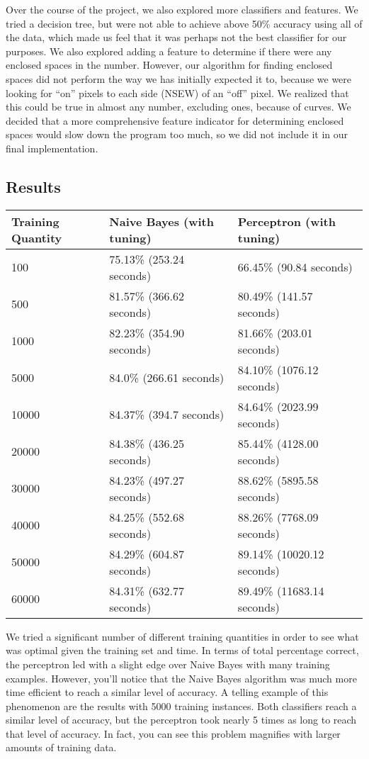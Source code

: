 \documentclass{article}
\theoremstyle{remark}
\begin{document}
    	Over the course of the project, we also explored more classifiers and features. We tried a decision tree, but were not able to achieve above 50\% accuracy using all of the data, which made us feel that it was perhaps not the best classifier for our purposes. We also explored adding a feature to determine if there were any enclosed spaces in the number. However, our algorithm for finding enclosed spaces did not perform the way we has initially expected it to, because we were looking for ``on'' pixels to each side (NSEW) of an ``off'' pixel. We realized that this could be true in almost any number, excluding ones, because of curves. We decided that a more comprehensive feature indicator for determining enclosed spaces would slow down the program too much, so we did not include it in our final implementation.
     \subsection*{Results}
     \begin{table}[h!]
        \centering
        \begin{tabular}{l|l|l}
        Training Quantity & Naive Bayes (with tuning) & Perceptron (with tuning)   \\ \hline
        100               & 75.13\% (253.24 seconds)  & 66.45\% (90.84 seconds)    \\
        500               & 81.57\% (366.62 seconds)  & 80.49\% (141.57 seconds)   \\
        1000              & 82.23\% (354.90 seconds)  & 81.66\% (203.01 seconds)   \\
        5000              & 84.0\% (266.61 seconds)   & 84.10\% (1076.12 seconds)  \\
        10000             & 84.37\% (394.7 seconds)   & 84.64\% (2023.99 seconds)  \\
        20000             & 84.38\% (436.25 seconds)  & 85.44\% (4128.00 seconds)  \\
        30000             & 84.23\% (497.27 seconds)  & 88.62\% (5895.58 seconds)  \\
        40000             & 84.25\% (552.68 seconds)  & 88.26\% (7768.09 seconds)  \\
        50000             & 84.29\% (604.87 seconds)  & 89.14\% (10020.12 seconds) \\
        60000             & 84.31\% (632.77 seconds)  & 89.49\% (11683.14 seconds) \\
        \end{tabular}
     \end{table}
     We tried a significant number of different training quantities in order to see what was optimal given the training set and time. In terms of total percentage correct, the perceptron led with a slight edge over Naive Bayes with many training examples. However, you'll notice that the Naive Bayes algorithm was much more time efficient to reach a similar level of accuracy. A telling example of this phenomenon are the results with 5000 training instances. Both classifiers reach a similar level of accuracy, but the perceptron took nearly 5 times as long to reach that level of accuracy. In fact, you can see this problem magnifies with larger amounts of training data.
\end{document}
